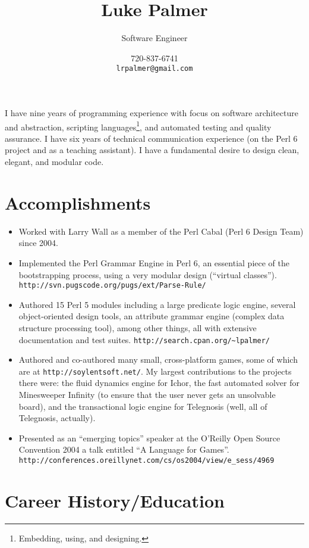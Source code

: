 \documentclass[12pt]{article}
\title{Luke Palmer}
\author{Software Engineer}
\date{720-837-6741 \\ \texttt{lrpalmer@gmail.com}}
\begin{document}
\maketitle

I have nine years of programming experience with focus on software
architecture and abstraction, scripting languages\footnote{Embedding,
using, and designing.}, and automated testing and quality assurance.  I
have six years of technical communication experience (on the Perl 6
project and as a teaching assistant). I have a fundamental desire to
design clean, elegant, and modular code.

\section*{Accomplishments}

\begin{itemize}
\item Worked with Larry Wall as a member of the Perl Cabal (Perl 6
Design Team) since 2004.
\item Implemented the Perl Grammar Engine in Perl 6, an essential piece
of the bootstrapping process, using a very modular design (``virtual
classes''). \\
\verb|http://svn.pugscode.org/pugs/ext/Parse-Rule/|
\item Authored 15 Perl 5 modules including a large predicate logic
engine, several object-oriented design tools, an attribute grammar
engine (complex data structure processing tool), among other things, all
with extensive documentation and test suites.
\verb|http://search.cpan.org/~lpalmer/|
\item Authored and co-authored many small, cross-platform games, some of
which are at \verb|http://soylentsoft.net/|.  My largest contributions
to the projects there were: the fluid dynamics engine for Ichor, the
fast automated solver for Minesweeper Infinity (to ensure that the user
never gets an unsolvable board), and the transactional logic engine for
Telegnosis (well, all of Telegnosis, actually).
\item Presented as an ``emerging topics'' speaker at the O'Reilly Open
Source Convention 2004 a talk entitled ``A Language for Games''.  \\
\verb|http://conferences.oreillynet.com/cs/os2004/view/e_sess/4969|
\end{itemize}

\section*{Career History/Education}
\end{document}
